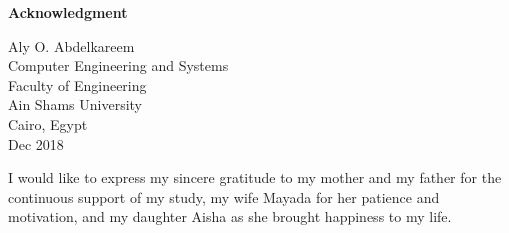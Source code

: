 \newpage
\thispagestyle{empty}

\begin{center}\huge \textbf{Acknowledgment}\end{center}

\begin{flushright}
\large
Aly O. Abdelkareem\\
Computer Engineering and Systems\\
Faculty of Engineering\\
Ain Shams University\\
Cairo, Egypt\\
Dec 2018
\end{flushright}



I would like to express my sincere gratitude to my mother and my father for the continuous support of my study, my wife Mayada for her patience and motivation, and my daughter Aisha as she brought happiness to my life.




